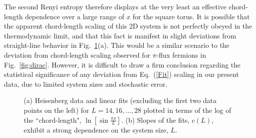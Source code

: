 \documentclass[prb,aps,twocolumn,floatfix,amsmath,amssymb,superscriptaddress,tightenlines]{revtex4}
\begin{document}
The second Renyi entropy therefore displays at the very least an effective chord-length dependence over a large range of $x$ for the square torus. It is possible that the apparent chord-length scaling of this 2D system is not perfectly obeyed in the thermodynamic limit, and that this fact is manifest in slight deviations from straight-line behavior in Fig.~{\ref{fig:heis_lines}}(a).
This would be a similar scenario to the deviation from chord-length scaling observed for $\pi$-flux fermions in Fig.~\ref{fig:dirac}.  
However, it is difficult to draw a firm conclusion regarding the statistical significance of any deviation from Eq.~(\ref{Fit}) scaling in our
present data, due to limited system sizes and stochastic error.

 \begin{figure}
   \begin{center}
   \end{center}
   \caption{(a) Heisenberg data and linear fits (excluding the first two data points on the left) for $L=14,16,\dots,28$ plotted in terms of the log of the ``chord-length", $\ln\left[\sin \frac{\pi x}{L}\right]$.
   (b) Slopes of the fits, $c(L)$, exhibit a strong dependence on the system size, $L$.
   }
   \label{fig:heis_lines}
 \end{figure}
\end{document}
